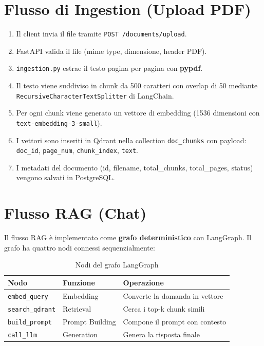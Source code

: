 \section{Flusso di Ingestion (Upload PDF)}

\begin{enumerate}
  \item Il client invia il file tramite \texttt{POST /documents/upload}.
  \item FastAPI valida il file (mime type, dimensione, header PDF).
  \item \texttt{ingestion.py} estrae il testo pagina per pagina con \textbf{pypdf}.
  \item Il testo viene suddiviso in chunk da 500 caratteri con overlap di 50
        mediante \texttt{RecursiveCharacterTextSplitter} di LangChain.
  \item Per ogni chunk viene generato un vettore di embedding (1536 dimensioni
        con \texttt{text-embedding-3-small}).
  \item I vettori sono inseriti in Qdrant nella collection \texttt{doc\_chunks}
        con payload: \texttt{doc\_id}, \texttt{page\_num}, \texttt{chunk\_index}, \texttt{text}.
  \item I metadati del documento (id, filename, total\_chunks, total\_pages, status)
        vengono salvati in PostgreSQL.
\end{enumerate}

\section{Flusso RAG (Chat)}

Il flusso RAG è implementato come \textbf{grafo deterministico} con LangGraph.
Il grafo ha quattro nodi connessi sequenzialmente:

\begin{table}[H]
  \centering
  \begin{tabularx}{\textwidth}{llX}
    \toprule
    \textbf{Nodo} & \textbf{Funzione} & \textbf{Operazione} \\
    \midrule
    \texttt{embed\_query}   & Embedding        & Converte la domanda in vettore \\
    \texttt{search\_qdrant} & Retrieval        & Cerca i top-k chunk simili \\
    \texttt{build\_prompt}  & Prompt Building  & Compone il prompt con contesto \\
    \texttt{call\_llm}      & Generation       & Genera la risposta finale \\
    \bottomrule
  \end{tabularx}
  \caption{Nodi del grafo LangGraph}
\end{table}


